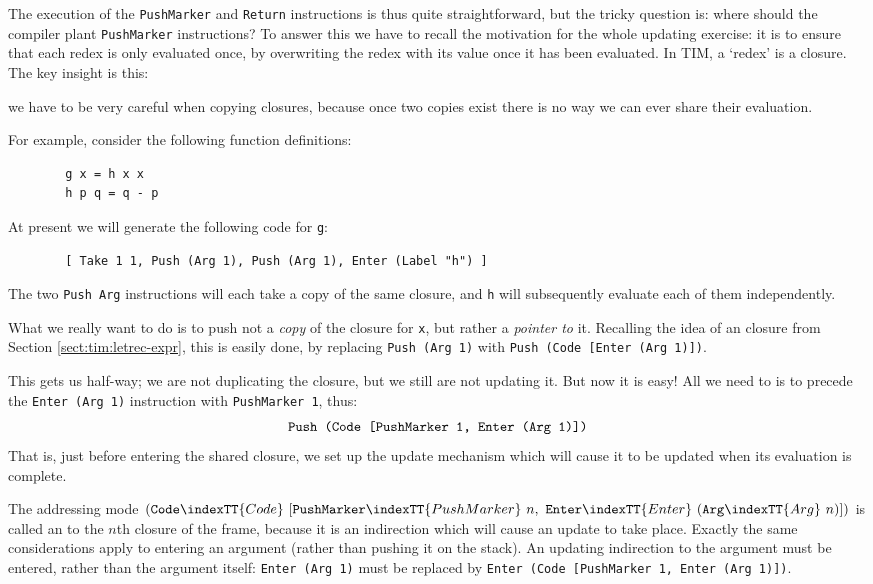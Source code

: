 The execution of the \mbox{\tt PushMarker} and \mbox{\tt Return} instructions
is thus quite straightforward,
but the tricky question is: where should the compiler plant \mbox{\tt PushMarker}
instructions?
To answer this we have to recall the motivation for the whole updating
exercise: it is to ensure that each redex is only evaluated once,
by overwriting the redex with its value once it has been evaluated.
In TIM, a `redex' is a closure.  The key insight is this:
\begin{important}
we have to be very careful when
copying closures, because
once two copies exist there is no way we can ever share their evaluation.
\end{important}
For example, consider the following function definitions:
\begin{verbatim}
        g x = h x x
        h p q = q - p
\end{verbatim}
At present we will generate the
following code for \mbox{\tt g}:
\begin{verbatim}
        [ Take 1 1, Push (Arg 1), Push (Arg 1), Enter (Label "h") ]
\end{verbatim}
The two \mbox{\tt Push\ Arg} instructions will each take a copy of the same closure,
and \mbox{\tt h} will subsequently evaluate each of them independently.

What we really want to do is to push not a {\em copy\/} of the closure
for \mbox{\tt x}, but rather a {\em pointer to\/} it.
Recalling the idea of an  closure
from Section \ref{sect:tim:letrec-expr}, this is easily done, by replacing
\mbox{\tt Push\ (Arg\ 1)} with \mbox{\tt Push\ (Code\ [Enter\ (Arg\ 1)])}.

This gets us half-way; we are not duplicating the closure, but we still are not
updating it.  But now it is easy!  All we need to is to precede the
\mbox{\tt Enter\ (Arg\ 1)} instruction with \mbox{\tt PushMarker\ 1}, thus:
\[
\mbox{\tt Push\ (Code\ [PushMarker\ 1,\ Enter\ (Arg\ 1)])}
\]
That is, just before entering the shared closure, we set up the update
mechanism which will cause it to be updated when its evaluation
is complete.

The addressing mode $(\mbox{\tt Code}\indexTT{Code}~ [\mbox{\tt PushMarker}\indexTT{PushMarker}~ n,~ \mbox{\tt Enter}\indexTT{Enter}~ (\mbox{\tt Arg}\indexTT{Arg}~ n)])$
is called an  to the $n$th closure of the frame,
because it is an indirection which will cause an update to take place.
Exactly the same considerations apply to entering an argument (rather than
pushing it on the stack).  An updating indirection to the argument
must be entered, rather than the argument itself:
\mbox{\tt Enter\ (Arg\ 1)} must be replaced by
\mbox{\tt Enter\ (Code\ [PushMarker\ 1,\ Enter\ (Arg\ 1)])}.

